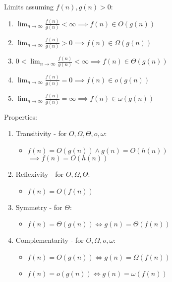 \documentclass[12pt, a4paper]{article}
\begin{document}
\begin{multicols*}{3}
Limits assuming $f(n), g(n) > 0$:
\begin{enumerate}[\roman*.]
  \item $\displaystyle\lim_{n\rightarrow\infty}$$\frac{f(n)}{g(n)} < \infty \implies f(n) \in O(g(n))$
  \item $\displaystyle\lim_{n\rightarrow\infty}$$\frac{f(n)}{g(n)} > 0 \implies f(n) \in \Omega(g(n))$
  \item $0 < \displaystyle\lim_{n\rightarrow\infty}$$\frac{f(n)}{g(n)} < \infty \implies f(n) \in \Theta(g(n))$
  \item $\displaystyle\lim_{n\rightarrow\infty}$$\frac{f(n)}{g(n)} = 0 \implies f(n) \in o(g(n))$
  \item $\displaystyle\lim_{n\rightarrow\infty}$$\frac{f(n)}{g(n)} = \infty \implies f(n) \in \omega(g(n))$
\end{enumerate}

Properties:
\begin{enumerate}[\roman*.]
  \item Transitivity - for $O, \Omega, \Theta, o, \omega$:
    \begin{itemize}[leftmargin=*]\vspace{2pt }
      \item $f(n) = O(g(n)) \land g(n) = O(h(n))$\\$\implies f(n) = O(h(n))$
    \end{itemize}
  \item Reflexivity - for $O, \Omega, \Theta$:
    \begin{itemize}[leftmargin=*]\vspace{2pt}
      \item $f(n) = O(f(n))$
    \end{itemize}
  \item Symmetry - for $\Theta$:
    \begin{itemize}[leftmargin=*]\vspace{2pt}
      \item $f(n) = \Theta(g(n)) \iff g(n) = \Theta(f(n))$
    \end{itemize}
  \item Complementarity - for $O, \Omega, o, \omega$:
    \begin{itemize}[leftmargin=*]\vspace{2pt}
      \item $f(n) = O(g(n)) \iff g(n) = \Omega(f(n))$
      \item $f(n) = o(g(n)) \iff g(n) = \omega(f(n))$
    \end{itemize}
\end{enumerate}


\end{multicols*}
\end{document}
